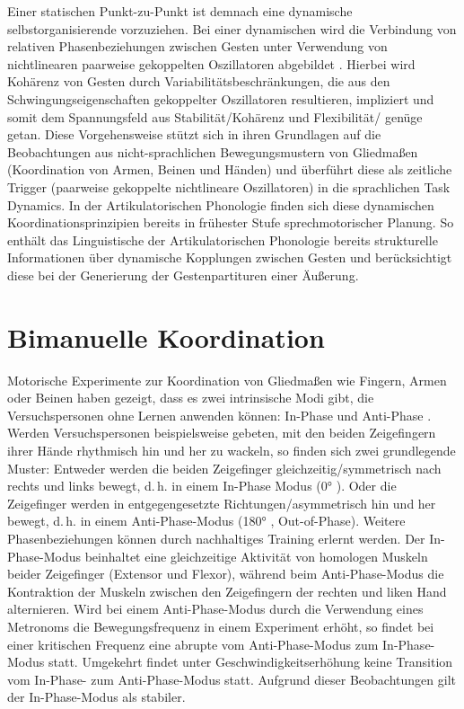 Einer statischen Punkt-zu-Punkt  ist demnach eine dynamische selbstorganisierende  vorzuziehen. Bei einer dynamischen  wird die Verbindung von relativen Phasenbeziehungen zwischen Gesten unter Verwendung von nichtlinearen paarweise gekoppelten Oszillatoren abgebildet \citep[vgl.][]{Saltzman2000,Goldstein2006,Goldstein2009,Nam2009a,Nam2009b,Pouplier2011a}. Hierbei wird Kohärenz von Gesten durch Variabilitätsbeschränkungen, die aus den Schwingungseigenschaften gekoppelter Oszillatoren resultieren, impliziert und somit dem Spannungsfeld aus Stabilität/Kohärenz und Flexibilität/ genüge getan. Diese Vorgehensweise stützt sich in ihren Grundlagen auf die Beobachtungen aus nicht-sprachlichen Bewegungsmustern von Gliedmaßen (Koordination von Armen, Beinen und Händen) und überführt diese als zeitliche Trigger (paarweise gekoppelte nichtlineare Oszillatoren) in die sprachlichen Task Dynamics. In der Artikulatorischen Phonologie finden sich diese dynamischen Koordinationsprinzipien bereits in frühester Stufe sprechmotorischer Planung. So enthält das Linguistische  der Artikulatorischen Phonologie bereits strukturelle Informationen über dynamische Kopplungen zwischen Gesten und berücksichtigt diese bei der Generierung der Gestenpartituren einer Äußerung. 

\section{Bimanuelle Koordination}
\label{sec:0301}

Motorische Experimente zur Koordination von Gliedmaßen wie Fingern, Armen oder Beinen haben gezeigt, dass es zwei intrinsische Modi gibt, die Versuchspersonen ohne Lernen anwenden können: In-Phase und Anti-Phase \citep{Kelso1981,Kelso1984b,Turvey1990,Blaufuß2001}. Werden Versuchspersonen beispielsweise gebeten, mit den beiden Zeigefingern ihrer Hände rhythmisch hin und her zu wackeln, so finden sich zwei grundlegende Muster: Entweder werden die beiden Zeigefinger gleichzeitig/symmetrisch nach rechts und links bewegt, d.\,h. in einem In-Phase Modus (0° ). Oder die Zeigefinger werden in entgegengesetzte Richtungen/asymmetrisch hin und her bewegt, d.\,h. in einem Anti-Phase-Modus (180° , Out-of-Phase). Weitere Phasenbeziehungen können durch nachhaltiges Training erlernt werden. Der In-Phase-Modus beinhaltet eine gleichzeitige Aktivität von homologen Muskeln beider Zeigefinger (Extensor und Flexor), während beim Anti-Phase-Modus die Kontraktion der Muskeln zwischen den Zeigefingern der rechten und liken Hand alternieren. Wird bei einem Anti-Phase-Modus durch die Verwendung eines Metronoms die Bewegungsfrequenz in einem Experiment erhöht, so findet bei einer kritischen Frequenz eine abrupte  vom Anti-Phase-Modus zum In-Phase-Modus statt. Umgekehrt findet unter Geschwindigkeitserhöhung keine Transition vom In-Phase- zum Anti-Phase-Modus statt. Aufgrund dieser Beobachtungen gilt der In-Phase-Modus als stabiler. 

